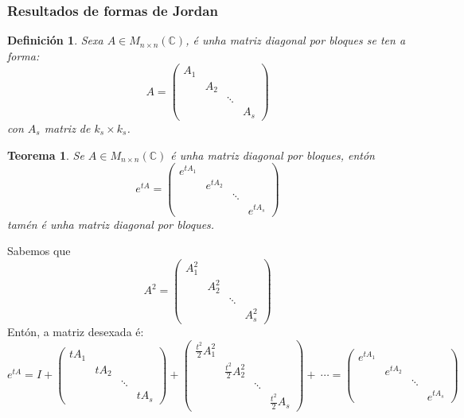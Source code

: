 \documentclass[11pt, a4paper,twoside]{article}
\makeatletter
\theoremstyle{theorem-style}  %
\newtheorem{theorem}{Teorema}[section]  %
\renewenvironment{proof}[1][\proofname]{\par
	\pushQED{\qed}%
	\normalfont \topsep6\p@\@plus6\p@\relax
	\list{}{%
		\settowidth{\leftmargin}{\quad:\hskip\labelsep}%
		\setlength{\labelwidth}{0pt}%
		\setlength{\itemindent}{-\leftmargin}%
	}%
	\item[\hskip\labelsep\itshape#1\@addpunct{:}]\ignorespaces
}{%
	\popQED\endlist\@endpefalse
}
\theoremstyle{definition-style}
\newtheorem{definition}{Definición}[section]
\theoremstyle{example-style}
\makeatother
\begin{document}
\subsubsection{Resultados de formas de Jordan}
\begin{definition}
	Sexa $ A\in M_{n\times n}(\mathbb{C}) $, é unha matriz diagonal por bloques se ten a forma:
	\[ A=\begin{pmatrix}
	A_{1}  \\
	& A_2  \\
	& & \ddots \\
	& & & A_s
	\end{pmatrix} \]
	con $ A_s $ matriz de $ k_s\times k_s $.
\end{definition}
\begin{theorem}
	Se $ A\in M_{n\times n}(\mathbb{C}) $ é unha matriz diagonal por bloques, entón 
	\[ e^{tA}= \begin{pmatrix}
	e^{tA_1}  \\
	& e^{tA_2}  \\
	& & \ddots \\
	& & & e^{tA_s}
	\end{pmatrix}\] tamén é unha matriz diagonal por bloques.
\end{theorem}
\begin{proof}
	Sabemos que 
	\[ A^2=\begin{pmatrix}
	A_{1}^2  \\
	& A_2^2  \\
	& & \ddots \\
	& & & A_s^2
	\end{pmatrix} \]
	Entón, a matriz desexada é:
	\[ e^{tA}=I+ \begin{pmatrix}
	tA_{1}  \\
	& tA_2  \\
	& & \ddots \\
	& & &t A_s
	\end{pmatrix} + \begin{pmatrix}
	\frac{t^2}{2}A_{1}^2  \\
	& \frac{t^2}{2}A_2^2  \\
	& & \ddots \\
	& & &\frac{t^2}{2} A_s
	\end{pmatrix}+ \ \cdots= \begin{pmatrix}
	e^{tA_1}  \\
	& e^{tA_2}  \\
	& & \ddots \\
	& & & e^{tA_s}
	\end{pmatrix} \]
\end{proof}
\end{document}
